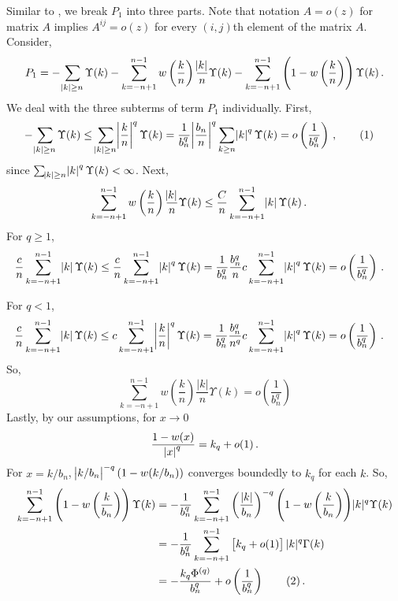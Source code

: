 \documentclass[11pt]{article}
\newcommand\numberthis{\addtocounter{equation}{1}\tag{\theequation}}
\theoremstyle{remark}
\begin{document}
%
Similar to \cite{hannan:1970}, we break $P_1$ into three parts. Note that notation $A = o(z)$ for matrix $A$  implies $A^{ij} = o(z)$ for every $(i,j)$th element of the matrix $A$. Consider,
\begin{equation}
\label{eq:P1_decomp}
P_1 = -\sum_{\abs{k}\geq n}\Upsilon(k)  -  \sum_{k = -n+1}^{n-1}w\left(\dfrac{k}{n}\right)\dfrac{\abs{k}}{n}\Upsilon(k)- \sum_{k = -n+1}^{n-1}\left(1-w\left(\dfrac{k}{n}\right)\right)\Upsilon(k)\,.  
\end{equation}
%
We deal with the three subterms of term $P_1$ individually. First,
%    
\begin{align*}
 {-\sum_{\abs{k}\geq n}\Upsilon(k)} &\leq  \sum_{\abs{k}\geq n} \abs{\dfrac{k}{n}}^q   \Upsilon(k) = \dfrac{1}{b_n^q}\abs{\dfrac{b_n}{n}}^q \sum_{k\geq n}\abs{k}^q  \Upsilon(k) = o\left(\dfrac{1}{b_n^q}\right)\,, \numberthis \label{eq:P1_first}
\end{align*}
%
since $\sum_{\abs{k}\geq n}\abs{k}^q \Upsilon(k)  < \infty$. Next,
%
\begin{align*}
 \sum_{k = -n+1}^{n-1}w\left(\dfrac{k}{n}\right)\dfrac{\abs{k}}{n}\Upsilon(k)   &\leq \dfrac{C}{n}\sum_{k = -n+1}^{n-1}\abs{k} \Upsilon(k)  \,.
\end{align*}
For $q\geq 1$,
\begin{align*}
\dfrac{c}{n}\sum_{k = -n+1}^{n-1}\abs{k}  \Upsilon(k) &\leq \dfrac{c}{n}\sum_{k = -n+1}^{n-1}\abs{k}^q  \Upsilon(k) = \dfrac{1}{b_n^q}\dfrac{b_n^q}{n} c\sum_{k = -n+1}^{n-1}\abs{k}^q  \Upsilon(k)  = o\left(\dfrac{1}{b_n^q}\right)\,.
\end{align*}
          
For $q <1$,
\begin{align*}
   \dfrac{c}{n}\sum_{k = -n+1}^{n-1}\abs{k} \Upsilon(k)  &\leq c\sum_{k =-n+1}^{n-1}\abs{\dfrac{k}{n}}^q  \Upsilon(k)  = \dfrac{1}{b_n^q}\dfrac{b_n^q}{n^q} c \sum_{k =-n+1}^{n-1}\abs{k}^q \Upsilon(k)  = o\left(\dfrac{1}{b_n^q}\right) \, .
\end{align*}
So,
\begin{equation}
\label{eq:P1_second}
 \sum_{k = -n+1}^{n-1}w\left(\dfrac{k}{n}\right)\dfrac{|k|}{n}\Upsilon(k) = o \left(\dfrac{1}{b_n^q} \right)
\end{equation}
Lastly, by our assumptions, for $x \to 0$
\[
\dfrac{1 - w(x)}{\abs{x}^q} = k_q + o(1)\,.
\]
For $x = k/b_n$, $\abs{k/b_n}^{-q}(1-w(k/b_n))$ converges boundedly to $k_q$ for each $k$.
So,
\begin{align*}
     \sum_{k = -n+1}^{n-1}\left(1-w\left(\dfrac{k}{b_n}\right)\right)\Upsilon(k) &= -\dfrac{1}{b_n^q}\sum_{k = -n+1}^{n-1}  \left(\dfrac{|k|}{b_n}\right)^{-q} {\left(1-w\left(\dfrac{k}{b_n}\right)\right)}|k|^q \Upsilon(k) \\
     & = -\dfrac{1}{b_n^q}\sum_{k = -n+1}^{n-1}   \left[k_q + o(1) \right]|k|^q \Gamma(k) \\
     & = -\dfrac{k_q \Phi^{(q)} }{b_n^q} + o\left( \dfrac{1}{b_n^q} \right) \numberthis \label{eq:P1_third}\,.
\end{align*}
\end{document}
